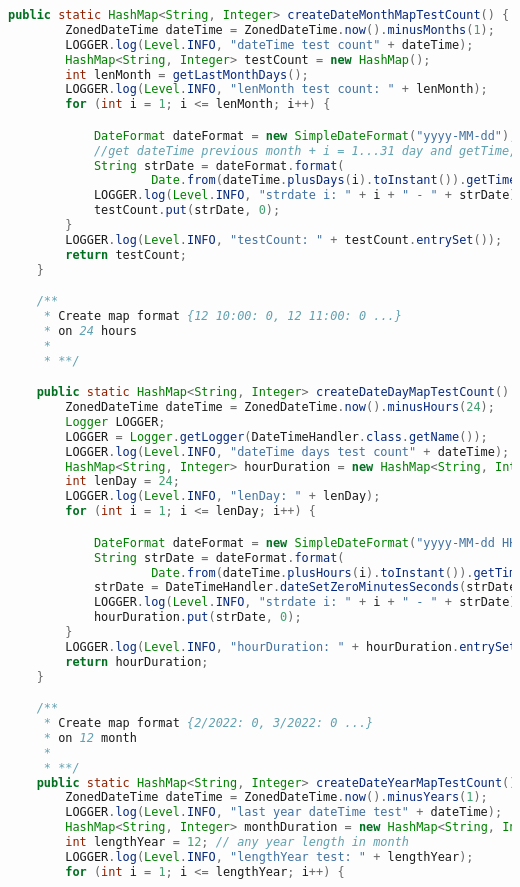 \begin{lstlisting}[language=Java]
    public static HashMap<String, Integer> createDateMonthMapTestCount() {
        ZonedDateTime dateTime = ZonedDateTime.now().minusMonths(1);
        LOGGER.log(Level.INFO, "dateTime test count" + dateTime);
        HashMap<String, Integer> testCount = new HashMap();
        int lenMonth = getLastMonthDays();
        LOGGER.log(Level.INFO, "lenMonth test count: " + lenMonth);
        for (int i = 1; i <= lenMonth; i++) {

            DateFormat dateFormat = new SimpleDateFormat("yyyy-MM-dd");
            //get dateTime previous month + i = 1...31 day and getTime, after in strDate=2022-03-22
            String strDate = dateFormat.format(
                    Date.from(dateTime.plusDays(i).toInstant()).getTime());
            LOGGER.log(Level.INFO, "strdate i: " + i + " - " + strDate);
            testCount.put(strDate, 0);
        }
        LOGGER.log(Level.INFO, "testCount: " + testCount.entrySet());
        return testCount;
    }

    /**
     * Create map format {12 10:00: 0, 12 11:00: 0 ...}
     * on 24 hours
     *
     * **/

    public static HashMap<String, Integer> createDateDayMapTestCount() throws ParseException {
        ZonedDateTime dateTime = ZonedDateTime.now().minusHours(24);
        Logger LOGGER;
        LOGGER = Logger.getLogger(DateTimeHandler.class.getName());
        LOGGER.log(Level.INFO, "dateTime days test count" + dateTime);
        HashMap<String, Integer> hourDuration = new HashMap<String, Integer>();
        int lenDay = 24;
        LOGGER.log(Level.INFO, "lenDay: " + lenDay);
        for (int i = 1; i <= lenDay; i++) {

            DateFormat dateFormat = new SimpleDateFormat("yyyy-MM-dd HH:mm:ss");
            String strDate = dateFormat.format(
                    Date.from(dateTime.plusHours(i).toInstant()).getTime());
            strDate = DateTimeHandler.dateSetZeroMinutesSeconds(strDate);
            LOGGER.log(Level.INFO, "strdate i: " + i + " - " + strDate);
            hourDuration.put(strDate, 0);
        }
        LOGGER.log(Level.INFO, "hourDuration: " + hourDuration.entrySet());
        return hourDuration;
    }

    /**
     * Create map format {2/2022: 0, 3/2022: 0 ...}
     * on 12 month
     *
     * **/
    public static HashMap<String, Integer> createDateYearMapTestCount() {
        ZonedDateTime dateTime = ZonedDateTime.now().minusYears(1);
        LOGGER.log(Level.INFO, "last year dateTime test" + dateTime);
        HashMap<String, Integer> monthDuration = new HashMap<String, Integer>();
        int lengthYear = 12; // any year length in month
        LOGGER.log(Level.INFO, "lengthYear test: " + lengthYear);
        for (int i = 1; i <= lengthYear; i++) {


\end{lstlisting}
